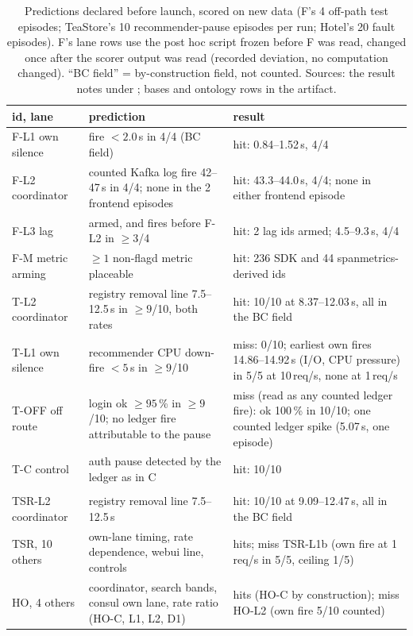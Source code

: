 \documentclass{ceurart}
\begin{document}
\begin{table}[t]
\caption{Predictions declared before launch, scored on new data (F's 4 off-path test episodes; TeaStore's 10 recommender-pause
episodes per run; Hotel's 20 fault episodes). F's lane rows use the post hoc script frozen before F was read, changed once
after the scorer output was read (recorded deviation, no computation changed). ``BC field'' = by-construction field, not
counted. Sources: the result notes under \protect{}; bases and ontology rows in the artifact.}
\label{tab:pred}
\footnotesize
\begin{tabular}{@{}>{\raggedright\arraybackslash}p{1.9cm}>{\raggedright\arraybackslash}p{6.0cm}>{\raggedright\arraybackslash}p{6.8cm}@{}}
\toprule
id, lane & prediction & result \\
\midrule
F-L1 own silence & fire $< 2.0$\,s in 4/4 (BC field) & hit: 0.84--1.52\,s, 4/4 \\
F-L2 coordinator & counted Kafka log fire 42--47\,s in 4/4; none in the 2 frontend episodes & hit: 43.3--44.0\,s, 4/4; none in either frontend episode \\
F-L3 lag & armed, and fires before F-L2 in $\geq 3$/4 & hit: 2 lag ids armed; 4.5--9.3\,s, 4/4 \\
F-M metric arming & $\geq 1$ non-flagd metric placeable & hit: 236 SDK and 44 spanmetrics-derived ids \\
T-L2 coordinator & registry removal line 7.5--12.5\,s in $\geq 9$/10, both rates & hit: 10/10 at 8.37--12.03\,s, all in the BC field \\
T-L1 own silence & recommender CPU down-fire $< 5$\,s in $\geq 9$/10 & miss: 0/10; earliest own fires 14.86--14.92\,s (I/O, CPU pressure) in 5/5 at 10\,req/s, none at 1\,req/s \\
T-OFF off route & login ok $\geq 95$\,\% in $\geq 9$/10; no ledger fire attributable to the pause & miss (read as any counted ledger fire): ok 100\,\% in 10/10; one counted ledger spike (5.07\,s, one episode) \\
T-C control & auth pause detected by the ledger as in C & hit: 10/10 \\
\midrule
\multicolumn{3}{@{}l}{\emph{TeaStore replication 2 and Hotel consul pause; committed \texttt{8b89d43} before replication 2 and the Hotel run launched}} \\
TSR-L2 coordinator & registry removal line 7.5--12.5\,s & hit: 10/10 at 9.09--12.47\,s, all in the BC field \\
TSR, 10 others & own-lane timing, rate dependence, webui line, controls & 9 hits; miss TSR-L1b (own fire at 1\,req/s in 5/5, ceiling 1/5) \\
HO, 4 others & coordinator, search bands, consul own lane, rate ratio (HO-C, L1, L2, D1) & 3 hits (HO-C by construction); miss HO-L2 (own fire 5/10 counted) \\
\bottomrule
\end{tabular}
\end{table}
\end{document}
